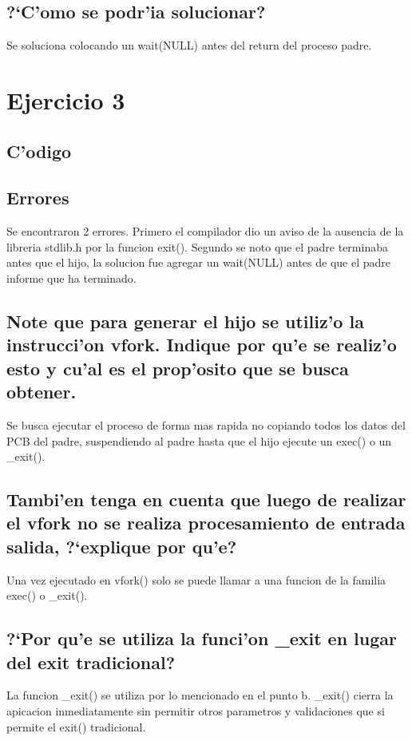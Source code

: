 \documentclass[a4paper,8pt]{article}
\newcommand{\?}{?`}
\begin{document}
\subsection[Punto C]{\?C'omo se podr'ia solucionar?}
Se soluciona colocando un wait(NULL) antes del return del proceso padre.

\section{Ejercicio 3}

\subsection{C'odigo}


\subsection{Errores}
Se encontraron 2 errores. Primero el compilador dio un aviso de la ausencia de la libreria stdlib.h por la funcion exit().
Segundo se noto que el padre terminaba antes que el hijo, la solucion fue agregar un wait(NULL) antes de que el padre informe que ha terminado.

\subsection[Punto A]{Note que para generar el hijo se utiliz'o la instrucci'on vfork. Indique por qu'e se realiz'o esto y cu'al es el prop'osito que se busca obtener.}
Se busca ejecutar el proceso de forma mas rapida no copiando todos los datos del PCB del padre, suspendiendo al padre hasta que el hijo ejecute un exec() o un \_exit().

\subsection[Punto B]{Tambi'en tenga en cuenta que luego de realizar el vfork no se realiza procesamiento de entrada salida, \?explique por qu'e?}
Una vez ejecutado en vfork() solo se puede llamar a una funcion de la familia exec() o \_exit().

\subsection[Punto C]{\?Por qu'e se utiliza la funci'on \_exit en lugar del exit tradicional?}
La funcion \_exit() se utiliza por lo mencionado en el punto b. \_exit() cierra la apicacion inmediatamente sin permitir otros parametros y validaciones que si permite el exit() tradicional.
\end{document}
